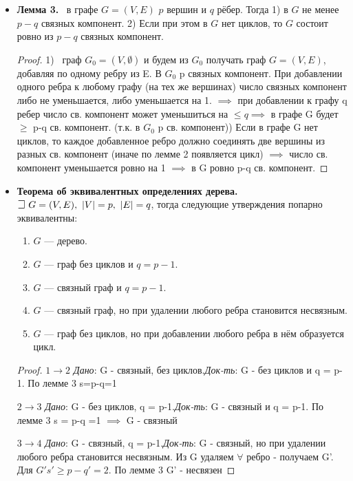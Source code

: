 \begin{itemize}
\item \textbf{Лемма 3.} 
\mathLet \ в графе $G = (V, E)$ $p$ вершин и $q$ рёбер. Тогда 
1) в $G$ не менее $p - q$ связных компонент. 
2) Если при этом в $G$ нет циклов, то $G$ состоит ровно из $p - q$ связных компонент.\newline
\begin{proof}
1) \faEye \ граф $G_0 = (V, \emptyset)$ и будем из $G_0$ получать граф $G = (V, E)$, добавляя по одному ребру из E. В $G_0$ p связных компонент. При добавлении одного ребра к любому графу (на тех же вершинах) число связных компонент либо не уменьшается, либо уменьшается на 1. $\implies$ при добавлении к графу q ребер число св. компонент может уменьшиться на $\leq q \implies$ в графе G будет $\geq$ p-q св. компонент. (т.к. в $G_0$ p св. компонент)) Если в графе G нет циклов, то каждое добавленное ребро должно соединять две вершины из разных св. компонент (иначе по лемме 2 появляется цикл) $\implies$ число св. компонент уменьшается ровно на 1 $\implies$ в G ровно p-q св. компонент.
\end{proof}


\item \textbf{Теорема об эквивалентных определениях дерева.}
$\mathLet ~ G = (V, E),~|V| = p,~|E| = q$, тогда следующие утверждения попарно эквивалентны:
\begin{enumerate}
    \item $G$ --- дерево.
    \item $G$ --- граф без циклов и $q = p - 1$.
    \item $G$ --- связный граф и $q = p - 1$.
    \item $G$ --- связный граф, но при удалении любого ребра становится несвязным.
    \item $G$ --- граф без циклов, но при добавлении любого ребра в нём образуется цикл. 
\end{enumerate}
\begin{proof}
$1 \rightarrow 2$ \textit{Дано}: G - связный, без циклов.\textit{Док-ть}: G - без циклов и q = p-1. \newline
По лемме 3 s=p-q=1

$2 \rightarrow 3$ \textit{Дано}: G - без циклов, q = p-1.\textit{Док-ть}: G - связный и q = p-1. \newline
По лемме 3 s = p-q =1 $\implies$ G - связный

$3 \rightarrow 4$ \textit{Дано}: G - связный, q = p-1.\textit{Док-ть}: G - связный, но при удалении любого ребра становится несвязным. \newline
Из G удаляем $\forall$ ребро - получаем G'. Для $G' s' \geq p-q'=2$. По лемме 3 G' - несвязен


\end{proof}
\end{itemize}
